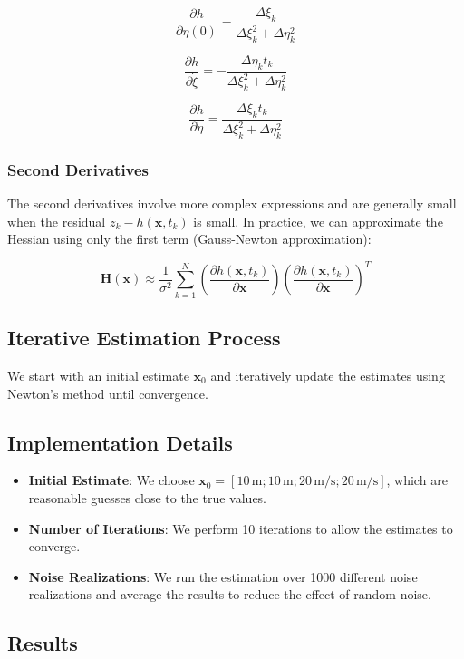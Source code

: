 \documentclass[12pt]{article}
\begin{document}
\[
\frac{\partial h}{\partial \eta(0)} = \frac{\Delta \xi_k}{\Delta \xi_k^2 + \Delta \eta_k^2}
\]

\[
\frac{\partial h}{\partial \dot{\xi}} = -\frac{\Delta \eta_k t_k}{\Delta \xi_k^2 + \Delta \eta_k^2}
\]

\[
\frac{\partial h}{\partial \dot{\eta}} = \frac{\Delta \xi_k t_k}{\Delta \xi_k^2 + \Delta \eta_k^2}
\]

\subsubsection{Second Derivatives}

The second derivatives involve more complex expressions and are generally small when the residual \( z_k - h(\mathbf{x}, t_k) \) is small. In practice, we can approximate the Hessian using only the first term (Gauss-Newton approximation):

\[
\mathbf{H}(\mathbf{x}) \approx \frac{1}{\sigma^2} \sum_{k=1}^{N} \left( \frac{\partial h(\mathbf{x}, t_k)}{\partial \mathbf{x}} \right) \left( \frac{\partial h(\mathbf{x}, t_k)}{\partial \mathbf{x}} \right)^T
\]

\subsection{Iterative Estimation Process}

We start with an initial estimate \( \mathbf{x}_0 \) and iteratively update the estimates using Newton's method until convergence.

\subsection{Implementation Details}

\begin{itemize}
    \item \textbf{Initial Estimate}: We choose \( \mathbf{x}_0 = [10\, \text{m}; 10\, \text{m}; 20\, \text{m/s}; 20\, \text{m/s}] \), which are reasonable guesses close to the true values.
    \item \textbf{Number of Iterations}: We perform 10 iterations to allow the estimates to converge.
    \item \textbf{Noise Realizations}: We run the estimation over 1000 different noise realizations and average the results to reduce the effect of random noise.
\end{itemize}

\subsection{Results}
\end{document}
